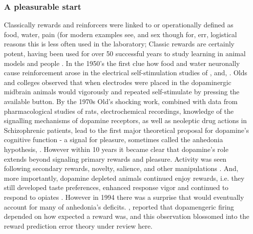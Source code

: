 \documentclass[doc,12pt]{apa}        %
\begin{document}
\subsubsection{A pleasurable start} %
\label{subsub:start}
Classically rewards and reinforcers were linked to or operationally defined as food, water, pain (for modern examples see,  and sex though for, err, logistical reasons this is less often used in the laboratory; Classic rewards are certainly potent, having been used for over 50 successful years to study learning in animal models \cite{iversen:2007aa} and people \cite{Kim:2010p7248,Montague:2006mz}.  In the 1950's the first clue how food and water neuronally cause reinforcement arose in the electrical self-stimulation studies of , and, .  Olds and colleges observed that when electrodes were placed in the dopaminergic midbrain animals would vigorously and repeated self-stimulate by pressing the available button.  By the 1970s Old's shocking work, combined with data from pharmacological studies of rats, electrochemical recordings, knowledge of the signalling mechanisms of dopamine receptors, as well as neoleptic drug actions in Schizophrenic patients, lead to the first major theoretical proposal for dopamine's cognitive function - a signal for pleasure, sometimes called the anhedonia hypothesis, \cite{Wise:1978p8771}.  However within 10 years it became clear that dopamine's role extends beyond signaling primary rewards and pleasure. Activity was seen following secondary rewards, novelty, salience, and other manipulations \cite{Spanagel:1999p8515, Salamone:2005p8774, BrombergMartin:2010p8834}.  And, more importantly, dopamine depleted animals continued enjoy rewards, i.e. they still developed taste preferences, enhanced response vigor \cite{Cannon:2003p8513} and continued to respond to opiates \cite{Hnasko:2005p8832}.  However in 1994 there was a surprise that would eventually account for many of anhedonia's deficits.  , reported that dopamengeric firing depended on how expected a reward was, and this observation blossomed into the reward prediction error theory under review here.
\end{document}
